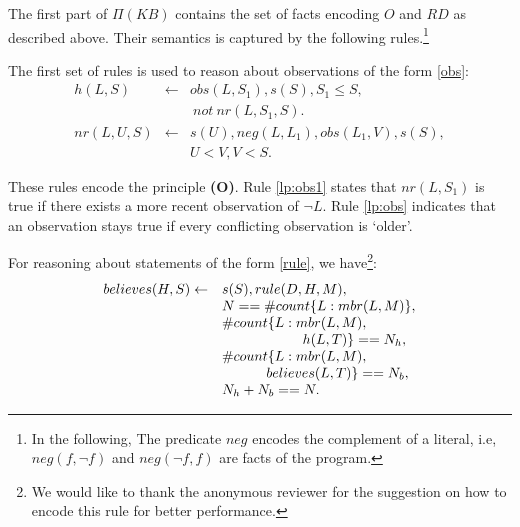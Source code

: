 \documentclass{article}
\def\naf{\: {not} \:}
\begin{document}
%
The first part of $\Pi(KB)$ contains the set of facts encoding $O$ and $RD$ as described above. Their semantics is captured by the following rules.\footnote{In the following, The  predicate $neg$ encodes the complement of a literal, i.e, $neg(f, \neg f)$ and $neg(\neg f, f)$ are facts of the program.}
%

The first set of rules is used to  reason about observations of the form 
\eqref{obs}:
%
\begin{eqnarray}  
h(L, S)  & \leftarrow &   obs(L,S_1), s(S),  S_1 \le S, \label{lp:obs} \\
&&\naf nr(L, S_1, S).    \nonumber\\
  nr(L, U, S)  & \leftarrow &  s(U), neg(L,L_1), obs(L_1, V), s(S), \label{lp:obs1} \\
  &&U {<} V, V {<} S.  \nonumber  %
\end{eqnarray} 

These rules encode the principle {\bf (O)}. Rule \eqref{lp:obs1} states that $nr(L,S_1)$ is true if there exists a more recent observation of  $\neg L$. Rule \eqref{lp:obs} indicates that an observation stays true if every conflicting observation is `older'.
 
 For reasoning about statements of the form \eqref{rule}, we have\footnote{
 We would like to thank the anonymous reviewer for the suggestion on how to encode this rule for better performance.  
 }:  %
%
\begin{equation}\label{lp:rule}
\begin{array}{ll}
believes(H, S) \leftarrow & s(S),  rule(D, H, M),  \\
        & N  == \# count \{L : mbr(L, M)\},\\
        & \# count \{L : mbr(L, M),\\
        &\hspace*{.8in}h(L, T) \}== N_h,  \\ 
        & \# count \{L : mbr(L, M),\\
        &\hspace*{.44in}believes(L, T) \}== N_b, \\
        & N_h+N_b==N.  \\ 
%
      \end{array}
\end{equation} 
\end{document}
